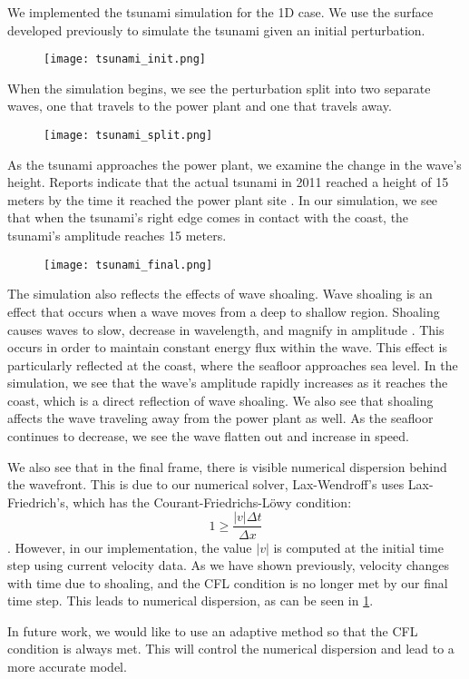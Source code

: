 \documentclass[../main.tex]{subfiles}
\begin{document}
We implemented the tsunami simulation for the 1D case.  We use the surface developed previously to simulate the tsunami given an initial perturbation. 

\begin{figure}[H]
\centering
\texttt{[image: tsunami\_init.png]}
\end{figure}

\noindent When the simulation begins, we see the perturbation split into two separate waves, one that travels to the power plant and one that travels away.

\begin{figure}[H]
\centering
\texttt{[image: tsunami\_split.png]}
\end{figure}


\noindent As the tsunami approaches the power plant, we examine the change in the wave's height.  Reports indicate that the actual tsunami in 2011 reached a height of 15 meters by the time it reached the power plant site \cite{nuclearAssociation}.  In our simulation, we see that when the tsunami's right edge comes in contact with the coast, the tsunami's amplitude reaches 15 meters.

\begin{figure}[H]
\label{tsunamiFinal}
\centering
\texttt{[image: tsunami\_final.png]}
\end{figure}

\noindent The simulation also reflects the effects of wave shoaling.  Wave shoaling is an effect that occurs when a wave moves from a deep to shallow region.  Shoaling causes waves to slow, decrease in wavelength, and magnify in amplitude \cite{shoaling}.  This occurs in order to maintain constant energy flux within the wave.  This effect is particularly reflected at the coast, where the seafloor approaches sea level.  In the simulation, we see that the wave's amplitude rapidly increases as it reaches the
coast, which is a direct reflection of wave shoaling.  We also see that shoaling affects the wave traveling away from the power plant as well.  As the seafloor continues to decrease, we see the wave flatten out and increase in speed.


\noindent We also see that in the final frame, there is visible numerical dispersion behind the wavefront.  This is due to our numerical solver, Lax-Wendroff's uses Lax-Friedrich's, which has the Courant-Friedrichs-L\"owy condition:
$$ 1\geq \frac{|v|\Delta t}{\Delta x}$$.
However, in our implementation, the value $|v|$ is computed at the initial time step using current velocity data.  As we have shown previously, velocity changes with time due to shoaling, and the CFL condition is no longer met by our final time step.  This leads to numerical dispersion, as can be seen in \ref{tsunamiFinal}.


\noindent In future work, we would like to use an adaptive method so that the CFL condition is always met.  This will control the numerical dispersion and lead to a more accurate model.
\end{document}
